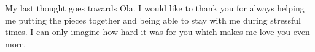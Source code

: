 My last thought goes towards Ola. I would like to thank you for always helping me putting the pieces together and being able to stay with me during stressful times. I can only imagine how hard it was for you which makes me love you even more. 







